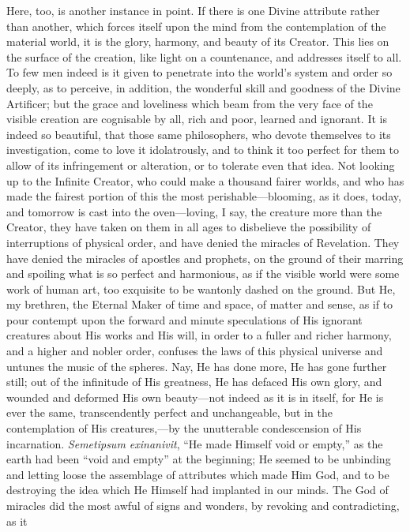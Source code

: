 Here, too, is another instance in point. If there is one Divine
attribute rather than another, which forces itself upon the mind from
the contemplation of the material world, it is the glory, harmony, and
beauty of its Creator. This lies on the surface of the creation, like
light on a countenance, and addresses itself to all. To few men indeed
is it given to penetrate into the world's system and order so deeply,
as to perceive, in addition, the wonderful skill and goodness of the
Divine Artificer; but the grace and loveliness which beam from the
very face of the visible creation are cognisable by all, rich and
poor, learned and ignorant. It is indeed so beautiful, that those same
philosophers, who devote themselves to its investigation, come to love
it idolatrously, and to think it too perfect for them to allow of its
infringement or alteration, or to tolerate even that idea. Not looking
up to the Infinite Creator, who could make a thousand fairer worlds,
and who has made the fairest portion of this the most perishable—blooming,
as it does, today, and tomorrow is cast into the oven—loving, I say,
the creature more than the Creator, they have taken on them in all
ages to disbelieve the possibility of interruptions of physical order,
and have denied the miracles of Revelation. They have denied the
miracles of apostles and prophets, on the ground of their marring and
spoiling what is so perfect and harmonious, as if the visible world
were some work of human art, too exquisite to be wantonly dashed on
the ground. But He, my brethren, the Eternal Maker of time and space,
of matter and sense, as if to pour contempt upon the forward and
minute speculations of His ignorant creatures about His works and His
will, in order to a fuller and richer harmony, and a higher and nobler
order, confuses the laws of this physical universe and untunes the
music of the spheres. Nay, He has done more, He has gone further
still; out of the infinitude of His greatness, He has defaced His own
glory, and wounded and deformed His own beauty—not indeed as it is
in itself, for He is ever the same, transcendently perfect and
unchangeable, but in the contemplation of His creatures,—by the
unutterable condescension of His incarnation.
\emph{Semetipsum exinanivit}, ``He made Himself void or
empty,'' as the earth had been ``void and empty'' at the
beginning; He seemed to be unbinding and letting loose the assemblage
of attributes which made Him God, and to be destroying the idea which
He Himself had implanted in our minds. The God of miracles did the
most awful of signs and wonders, by revoking and contradicting, as it
